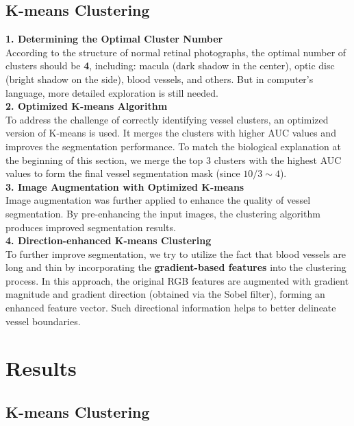 \documentclass[final]{article}
\begin{document}
\subsection{K-means Clustering}
\textbf{1. Determining the Optimal Cluster Number} \\
According to the structure of normal retinal photographs, the optimal number of clusters should be \textbf{4}, including: macula (dark shadow in the center), optic disc (bright shadow on the side), blood vessels, and others. But in computer's language, more detailed exploration is still needed. \\
\textbf{2. Optimized K-means Algorithm} \\
To address the challenge of correctly identifying vessel clusters, an optimized version of K-means is used. It merges the clusters with higher AUC values and improves the segmentation performance. To match the biological explanation at the beginning of this section, we merge the top 3 clusters with the highest AUC values to form the final vessel segmentation mask (since $10/3 \sim 4$).\\
\textbf{3. Image Augmentation with Optimized K-means} \\
Image augmentation was further applied to enhance the quality of vessel segmentation. By pre-enhancing the input images, the clustering algorithm produces improved segmentation results. \\
\textbf{4. Direction-enhanced K-means Clustering} \\
To further improve segmentation, we try to utilize the fact that blood vessels are long and thin by incorporating the \textbf{gradient-based features} into the clustering process. In this approach, the original RGB features are augmented with gradient magnitude and gradient direction (obtained via the Sobel filter), forming an enhanced feature vector. Such directional information helps to better delineate vessel boundaries.



\section{Results}
\subsection{K-means Clustering}
\end{document}
